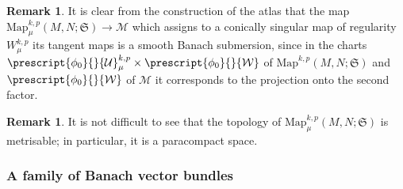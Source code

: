 \documentclass{article}
\numberwithin{equation}{section}        %
\theoremstyle{bfnote}
\theoremstyle{definition}
\theoremstyle{bfremark}
\newtheorem{rem}[thm]{Remark}               %
\newcommand{\Map}{\mathrm{Map}}             %
\begin{document}
\begin{rem}
    It is clear from the construction of the atlas that the map $\Map^{k,p}_\mu(M,N;\mathfrak{S}) \to \mathcal{M}$ which assigns to a conically singular map of regularity $W^{k,p}_\mu$ its tangent maps is a smooth Banach submersion, since in the charts $\prescript{\phi_0}{}{\mathcal{U}}^{k,p}_\mu \times \prescript{\phi_0}{}{\mathcal{W}}$ of $\Map^{k,p}(M,N;\mathfrak{S})$ and $\prescript{\phi_0}{}{\mathcal{W}}$ of $\mathcal{M}$ it corresponds to the projection onto the second factor.
\end{rem}

\begin{rem}
    It is not difficult to see that the topology of $\Map^{k,p}_\mu(M,N;\mathfrak{S})$ is metrisable; in particular, it is a paracompact space.
\end{rem}


    \subsubsection{A family of Banach vector bundles}   \label{subsubsec: Banach vector bundles}
\end{document}
